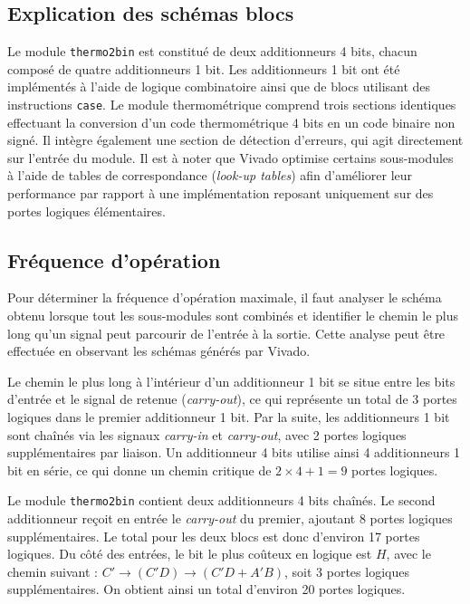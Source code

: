 \documentclass[a11paper]{article}
\begin{document}
\subsection{Explication des schémas blocs}

Le module \texttt{thermo2bin} est constitué de deux additionneurs 4 bits,
chacun composé de quatre additionneurs 1 bit. Les additionneurs 1 bit ont été
implémentés à l’aide de logique combinatoire ainsi que de blocs utilisant des
instructions \texttt{case}. Le module thermométrique comprend trois sections
identiques effectuant la conversion d’un code thermométrique 4 bits en un
code binaire non signé. Il intègre également une section de détection
d’erreurs, qui agit directement sur l’entrée du module. Il est à noter que
Vivado optimise certains sous-modules à l’aide de tables de correspondance
(\textit{look-up tables}) afin d’améliorer leur performance par rapport à une
implémentation reposant uniquement sur des portes logiques élémentaires.

\subsection{Fréquence d’opération}

Pour déterminer la fréquence d’opération maximale, il faut analyser le schéma
obtenu lorsque tout les sous-modules sont combinés et identifier le chemin le
plus long qu’un signal peut parcourir de l’entrée à la sortie. Cette analyse
peut être effectuée en observant les schémas générés par Vivado.

Le chemin le plus long à l’intérieur d’un additionneur 1 bit se situe entre
les bits d’entrée et le signal de retenue (\textit{carry-out}), ce qui
représente un total de 3 portes logiques dans le premier additionneur 1 bit.
Par la suite, les additionneurs 1 bit sont chaînés via les signaux
\textit{carry-in} et \textit{carry-out}, avec 2 portes logiques
supplémentaires par liaison. Un additionneur 4 bits utilise ainsi 4
additionneurs 1 bit en série, ce qui donne un chemin critique de
$2 \times 4 + 1 = 9$ portes logiques.

Le module \texttt{thermo2bin} contient deux additionneurs 4 bits chaînés. Le
second additionneur reçoit en entrée le \textit{carry-out} du premier,
ajoutant 8 portes logiques supplémentaires. Le total pour les deux blocs est
donc d’environ 17 portes logiques. Du côté des entrées, le bit le plus
coûteux en logique est $H$, avec le chemin suivant : $C' \rightarrow (C'D)
	\rightarrow (C'D + A'B)$, soit 3 portes logiques supplémentaires. On obtient
ainsi un total d’environ 20 portes logiques.
\end{document}
